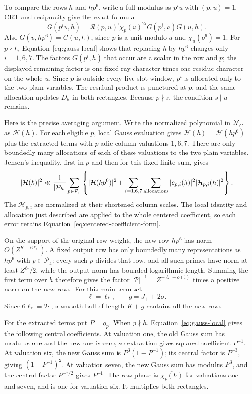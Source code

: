 \documentclass[11pt,a4paper]{article}
\numberwithin{equation}{section}
\numberwithin{figure}{section}
\theoremstyle{definition}
\theoremstyle{remark}
\begin{document}
To compare the rows \(h\) and \(hp^6\), write a full modulus as \(p^iu\) with
\((p,u)=1\).  CRT and reciprocity give the exact formula
\[
 G(p^iu,h)
 =\mathcal R(p,u)^i\chi_p(u)^{2i}G(p^i,h)G(u,h).
\]
Also \(G(u,hp^6)=G(u,h)\), since \(p\) is a unit modulo \(u\)
and \(\chi_u(p^6)=1\).
For \(p\nmid h\), Equation~\eqref{eq:gauss-local} shows that
replacing \(h\) by \(hp^6\) changes only \(i=1,6,7\).
The factors \(G(p^i,h)\) that occur are a scalar in the row and
\(p\); the displayed remaining factor is one fixed-ray character
times one residue character on the whole \(u\).  Since \(p\) is
outside every live slot window, \(p^i\) is allocated only to the two
plain variables.  The residual product is punctured at \(p\), and
the same allocation updates \(D_{\mathbf b}\) in both rectangles.
Because \(p\nmid s\), the condition \(s\mid u\) remains.

Here is the precise averaging argument.  Write the normalized
polynomial in \(\mathcal N_C\) as \(\mathcal H(h)\).  For each
eligible \(p\), local Gauss evaluation gives
\(\mathcal H(h)=\mathcal H(hp^6)\) plus the extracted terms with
\(p\)-adic column valuations \(1,6,7\).  There are only boundedly
many allocations of each of these valuations to the two plain
variables.  Jensen's inequality, first in \(p\) and then for this
fixed finite sum, gives
\[
 |\mathcal H(h)|^2\ll
 \frac1{|\mathcal P_h|}\sum_{p\in\mathcal P_h}
 \left\{|\mathcal H(hp^6)|^2+
        \sum_{i=1,6,7}\sum_{\rm allocations}
        |c_{p,i}(h)|^2|\mathcal H_{p,i}(h)|^2\right\}.
\]
The \(\mathcal H_{p,i}\) are normalized at their shortened column
scales.  The local identity and allocation just described are applied to the
whole centered coefficient, so each error retains
Equation~\eqref{eq:centered-coefficient-form}.

On the support of the original row weight, the new row \(hp^6\)
has norm \(O(Z^{K+6\ell_*})\).  A fixed output row has only
boundedly many representations as \(hp^6\) with \(p\in\mathcal P_h\):
every such \(p\) divides that row, and all such primes have norm at
least \(Z^{\ell_*}/2\), while the output norm has bounded
logarithmic length.  Summing the first term over \(h\) therefore
gives the factor \(|\mathcal P|^{-1}=Z^{-\ell_*+o(1)}\)
times a positive norm on the new rows.  For this main term set
\[
 \ell=\ell_*,\qquad g=J_++2\sigma.
\]
Since \(6\ell_*=2\sigma\), a smooth ball of length \(K+g\)
contains all the new rows.

For the extracted terms put \(P=q_p\).  When \(p\nmid h\),
Equation~\eqref{eq:gauss-local} gives the following central
coefficients.  At valuation one, the old Gauss sum has modulus one
and the new one is zero, so extraction gives squared coefficient
\(P^{-1}\).  At valuation six, the new Gauss sum is
\(P^3(1-P^{-1})\); its central factor is \(P^{-3}\), giving
\((1-P^{-1})^2\).  At valuation seven, the new Gauss sum has
modulus \(P^3\), and the central factor \(P^{-7/2}\) gives
\(P^{-1}\).  The row phase is \(\overline{\chi_p(h)}\) for
valuations one and seven, and is one for valuation six.  It
multiplies both rectangles.
\end{document}

